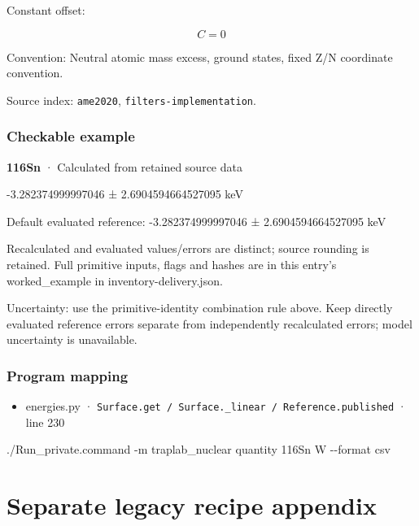 \documentclass[
  11pt,
  letterpaper,
]{article}
\newenvironment{Shaded}{}{}
\newcommand{\AttributeTok}[1]{\textcolor[rgb]{0.49,0.56,0.16}{#1}}
\newcommand{\ExtensionTok}[1]{#1}
\newcommand{\NormalTok}[1]{#1}
\providecommand{\tightlist}{%
  \setlength{\itemsep}{0pt}\setlength{\parskip}{0pt}}
\begin{document}
Constant offset:

\[
C=0
\]

Convention: Neutral atomic mass excess, ground states, fixed Z/N
coordinate convention.

Source index: \texttt{ame2020}, \texttt{filters-implementation}.

\subsubsection{Checkable example}\label{checkable-example-38}

\textbf{116Sn} · Calculated from retained source data

-3.282374999997046 ± 2.6904594664527095 keV

Default evaluated reference: -3.282374999997046 ± 2.6904594664527095 keV

Recalculated and evaluated values/errors are distinct; source rounding
is retained. Full primitive inputs, flags and hashes are in this entry's
worked\_example in inventory-delivery.json.

Uncertainty: use the primitive-identity combination rule above. Keep
directly evaluated reference errors separate from independently
recalculated errors; model uncertainty is unavailable.

\subsubsection{Program mapping}\label{program-mapping-38}

\begin{itemize}
\tightlist
\item
  energies.py ·
  \texttt{Surface.get\ /\ Surface.\_linear\ /\ Reference.published} ·
  line 230
\end{itemize}

\begin{Shaded}
\begin{Highlighting}[]
\ExtensionTok{./Run\_private.command} \AttributeTok{{-}m}\NormalTok{ traplab\_nuclear quantity 116Sn W }\AttributeTok{{-}{-}format}\NormalTok{ csv}
\end{Highlighting}
\end{Shaded}

\section{Separate legacy recipe
appendix}\label{separate-legacy-recipe-appendix}
\end{document}
